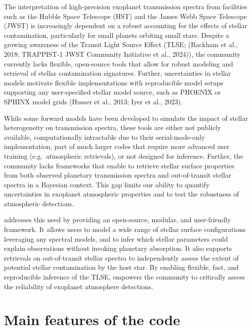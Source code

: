 \documentclass[10pt,a4paper,onecolumn]{article}
\let\textttOrig=\texttt
\def\texttt#1{\expandafter\textttOrig{\seqsplit{#1}}}
\begin{document}
The interpretation of high-precision exoplanet transmission spectra from
facilities such as the Hubble Space Telescope (HST) and the James Webb
Space Telescope (JWST) is increasingly dependent on a robust accounting
for the effects of stellar contamination, particularly for small planets
orbiting small stars. Despite a growing awareness of the Transit Light
Source Effect (TLSE; (Rackham et al., 2018; TRAPPIST-1 JWST Community
Initiative et al., 2024)), the community currently lacks flexible,
open-source tools that allow for robust modeling and retrieval of
stellar contamination signatures. Further, uncertainties in stellar
models motivate flexible implementations with reproducible model setups
supporting any user-specified stellar model source, such as PHOENIX or
SPHINX model grids (Husser et al., 2013; Iyer et al., 2023).

While some forward models have been developed to simulate the impact of
stellar heterogeneity on transmission spectra, these tools are either
not publicly available, computationally intractable due to their
serial-mode-only implementation, part of much larger codes that require
more advanced user training (e.g.~atmospheric retrievals), or not
designed for inference. Further, the community lacks frameworks that
enable to retrieve stellar surface properties from both observed
planetary transmission spectra and out-of-transit stellar spectra in a
Bayesian context. This gap limits our ability to quantify uncertainties
in exoplanet atmospheric properties and to test the robustness of
atmospheric detections.

\texttt{stctm} addresses this need by providing an open-source, modular,
and user-friendly framework. It allows users to model a wide range of
stellar surface configurations leveraging any spectral models, and to
infer which stellar parameters could explain observations without
invoking planetary absorption. It also supports retrievals on
out-of-transit stellar spectra to independently assess the extent of
potential stellar contamination by the host star. By enabling flexible,
fast, and reproducible inference of the TLSE, \texttt{stctm} empowers
the community to critically assess the reliability of exoplanet
atmosphere detections.

\hypertarget{main-features-of-the-code}{%
\section{Main features of the code}\label{main-features-of-the-code}}
\end{document}
